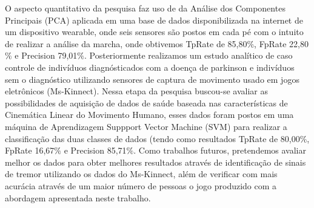 O aspecto quantitativo da pesquisa faz uso de da Análise dos Componentes Principais (PCA) aplicada em uma base de dados disponibilizada na internet de um dispositivo wearable, onde seis sensores são postos em cada pé com o intuito de realizar a análise da marcha, onde obtivemos TpRate de 85,80$\%$, FpRate 22,80$\%$ e Precision 79,01$\%$. Posteriormente realizamos um estudo analítico de caso controle de indivíduos diagnósticados com a doença de parkinson e indivíduos sem o diagnóstico utilizando sensores de captura de movimento usado em jogos eletrônicos (Ms-Kinnect). Nessa etapa da pesquisa buscou-se avaliar as possibilidades de aquisição de dados de saúde baseada nas características de Cinemática Linear do Movimento Humano, esses dados foram postos em uma máquina de Aprendizagem Suppport Vector Machine (SVM) para realizar a classificação das duas classes de dados (tendo como resultados TpRate de 80,00$\%$, FpRate 16,67$\%$ e Precision 85,71$\%$. 
Como trabalhos futuros, pretendemos avaliar melhor os dados para obter melhores resultados através de identificação de sinais de tremor utilizando os dados do Ms-Kinnect, além de verificar com mais acurácia através de um maior número de pessoas o jogo produzido com a abordagem apresentada neste trabalho.








